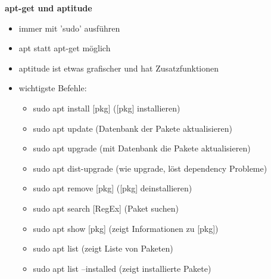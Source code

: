 \documentclass[12pt,utf8, 10pt]{article}
\begin{document}
\textbf{apt-get und aptitude}
\begin{itemize}
	\item immer mit 'sudo' ausführen
	\item apt statt apt-get möglich
	\item aptitude ist etwas grafischer und hat Zusatzfunktionen
	\item wichtigste Befehle:
	\begin{itemize}
		\item sudo apt install [pkg] ([pkg] installieren)
		\item sudo apt update (Datenbank der Pakete aktualisieren)
		\item sudo apt upgrade (mit Datenbank die Pakete aktualisieren)
		\item sudo apt dist-upgrade (wie upgrade, löst dependency Probleme)
		\item sudo apt remove [pkg] ([pkg] deinstallieren)
		\item sudo apt search [RegEx] (Paket suchen)
		\item sudo apt show [pkg] (zeigt Informationen zu [pkg])
		\item sudo apt list (zeigt Liste von Paketen)
		\item sudo apt list --installed (zeigt installierte Pakete)
	\end{itemize}
\end{itemize}
\end{document}
